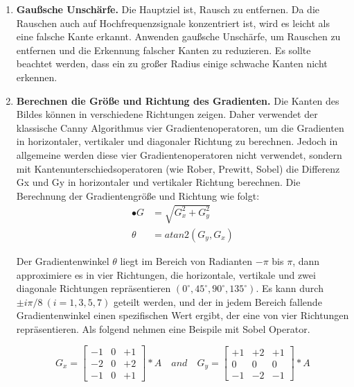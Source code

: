 \begin{enumerate}
	\item \textbf{Gaußsche Unschärfe.} Die Hauptziel ist, Rausch zu entfernen. Da die Rauschen auch auf Hochfrequenzsignale konzentriert ist, wird es leicht als eine falsche Kante erkannt. Anwenden gaußsche Unschärfe, um Rauschen zu entfernen und die Erkennung falscher Kanten zu reduzieren. Es sollte beachtet werden, dass ein zu großer Radius einige schwache Kanten nicht erkennen.
	\item \textbf{Berechnen die Größe und Richtung des Gradienten.} Die Kanten des Bildes können in verschiedene Richtungen zeigen. Daher verwendet der klassische Canny Algorithmus vier Gradientenoperatoren, um die Gradienten in horizontaler, vertikaler und diagonaler Richtung zu berechnen. Jedoch in allgemeine werden diese vier Gradientenoperatoren nicht verwendet, sondern mit Kantenunterschiedsoperatoren (wie Rober, Prewitt, Sobel) die Differenz Gx und Gy in horizontaler und vertikaler Richtung berechnen. Die Berechnung der Gradientengröße und Richtung wie folgt:	
\begin{equation}
\begin{split}
•  G   & = \sqrt{G_x^{2} + G_y^{2}} \\
\theta & = atan2(G_y,G_x)
\end{split}
\end{equation}

Der Gradientenwinkel $ \theta $ liegt im Bereich von Radianten $ -\pi $ bis $ \pi $, dann approximiere es in vier Richtungen, die horizontale, vertikale und zwei diagonale Richtungen repräsentieren    $(0^{\circ}, 45^{\circ}, 90^{\circ}, 135^{\circ}) $. Es kann durch $  \pm i \pi / 8\ (i =1, 3, 5, 7) $ geteilt werden, und der in jedem Bereich fallende Gradientenwinkel einen spezifischen Wert ergibt, der eine von vier Richtungen repräsentieren. Als folgend nehmen eine Beispile mit Sobel Operator.

\begin{equation}
G_x = \begin{bmatrix}
-1 &0 &+1 \\
-2 &0 &+2 \\
-1 &0 &+1
\end{bmatrix} * A \quad and \quad G_y = \begin{bmatrix}
+1 &+2 &+1 \\
0 &0 &0 \\
-1 &-2 &-1
\end{bmatrix} * A
\end{equation}
	

\end{enumerate}
